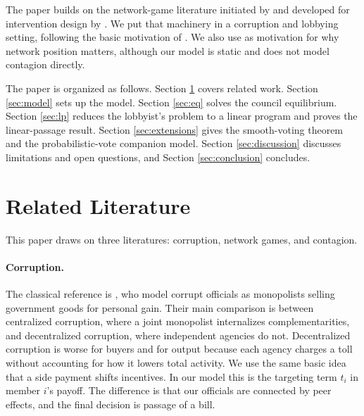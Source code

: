 \documentclass[11pt,letterpaper]{article}
\theoremstyle{plain}
\theoremstyle{definition}
\theoremstyle{remark}
\begin{document}
The paper builds on the network-game literature initiated by \citet{bcz2006} and developed for intervention design by \citet{ggg2020}. We put that machinery in a corruption and lobbying setting, following the basic motivation of \citet{shleifer1993}. We also use \citet{morris2000} as motivation for why network position matters, although our model is static and does not model contagion directly.

The paper is organized as follows. Section \ref{sec:related} covers related work. Section \ref{sec:model} sets up the model. Section \ref{sec:eq} solves the council equilibrium. Section \ref{sec:lp} reduces the lobbyist's problem to a linear program and proves the linear-passage result. Section \ref{sec:extensions} gives the smooth-voting theorem and the probabilistic-vote companion model. Section \ref{sec:discussion} discusses limitations and open questions, and Section \ref{sec:conclusion} concludes.


\section{Related Literature}
\label{sec:related}

This paper draws on three literatures: corruption, network games, and contagion.

\paragraph{Corruption.} The classical reference is \citet{shleifer1993}, who model corrupt officials as monopolists selling government goods for personal gain. Their main comparison is between centralized corruption, where a joint monopolist internalizes complementarities, and decentralized corruption, where independent agencies do not. Decentralized corruption is worse for buyers and for output because each agency charges a toll without accounting for how it lowers total activity. We use the same basic idea that a side payment shifts incentives. In our model this is the targeting term $t_i$ in member $i$'s payoff. The difference is that our officials are connected by peer effects, and the final decision is passage of a bill.
\end{document}
